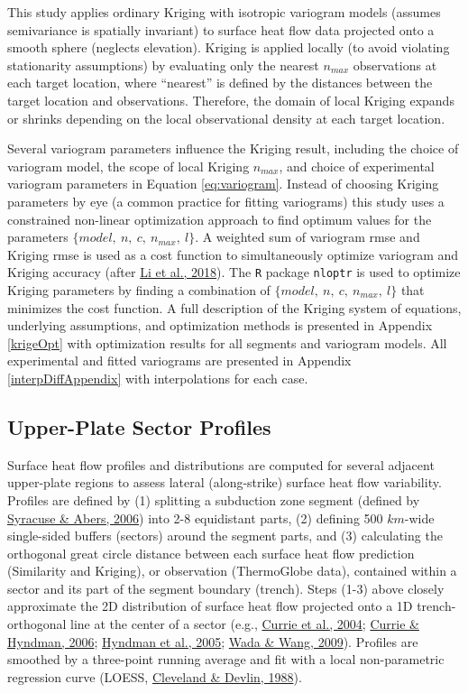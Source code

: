 This study applies ordinary Kriging with isotropic variogram models (assumes semivariance is spatially invariant) to surface heat flow data projected onto a smooth sphere (neglects elevation). Kriging is applied locally (to avoid violating stationarity assumptions) by evaluating only the nearest \(n_{max}\) observations at each target location, where ``nearest'' is defined by the distances between the target location and observations. Therefore, the domain of local Kriging expands or shrinks depending on the local observational density at each target location.

Several variogram parameters influence the Kriging result, including the choice of variogram model, the scope of local Kriging \(n_{max}\), and choice of experimental variogram parameters in Equation \eqref{eq:variogram}. Instead of choosing Kriging parameters by eye (a common practice for fitting variograms) this study uses a constrained non-linear optimization approach to find optimum values for the parameters \(\{model,\ n,\ c,\ n_{max},\ l\}\). A weighted sum of variogram \gls{rmse} and Kriging \gls{rmse} is used as a cost function to simultaneously optimize variogram and Kriging accuracy (after \protect\hyperlink{ref-li2018}{Li et al., 2018}). The \texttt{R} package \texttt{nloptr} is used to optimize Kriging parameters by finding a combination of \(\{model,\ n,\ c,\ n_{max},\ l\}\) that minimizes the cost function. A full description of the Kriging system of equations, underlying assumptions, and optimization methods is presented in Appendix \ref{krigeOpt} with optimization results for all segments and variogram models. All experimental and fitted variograms are presented in Appendix \ref{interpDiffAppendix} with interpolations for each case.

\hypertarget{upSectors}{%
\subsection{Upper-Plate Sector Profiles}\label{upSectors}}

Surface heat flow profiles and distributions are computed for several adjacent upper-plate regions to assess lateral (along-strike) surface heat flow variability. Profiles are defined by (1) splitting a subduction zone segment (defined by \protect\hyperlink{ref-syracuse2006}{Syracuse \& Abers, 2006}) into 2-8 equidistant parts, (2) defining 500 \(km\)-wide single-sided buffers (sectors) around the segment parts, and (3) calculating the orthogonal great circle distance between each surface heat flow prediction (Similarity and Kriging), or observation (ThermoGlobe data), contained within a sector and its part of the segment boundary (trench). Steps (1-3) above closely approximate the 2D distribution of surface heat flow projected onto a 1D trench-orthogonal line at the center of a sector (e.g., \protect\hyperlink{ref-currie2004}{Currie et al., 2004}; \protect\hyperlink{ref-currie2006}{Currie \& Hyndman, 2006}; \protect\hyperlink{ref-hyndman2005}{Hyndman et al., 2005}; \protect\hyperlink{ref-wada2009}{Wada \& Wang, 2009}). Profiles are smoothed by a three-point running average and fit with a local non-parametric regression curve (LOESS, \protect\hyperlink{ref-cleveland1988}{Cleveland \& Devlin, 1988}).

